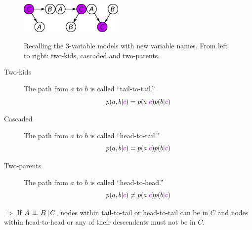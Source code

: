 \begin{figure}[H]
\centering
\includegraphics[width=0.15\textwidth]{fig/twokids-abc-color.pdf}\hspace{1cm}\includegraphics[width=0.15\textwidth]{fig/cascaded-abc-color.pdf}\hspace{2cm}\includegraphics[width=0.15\textwidth]{fig/twoparents-abc-color.pdf}
\caption{Recalling the 3-variable models with new variable names. From left to right: two-kids, cascaded and two-parents.\label{fig:3-var-highlighted}}
\end{figure}
\begin{description}
 \item[Two-kids] The path from $a$ to $b$ is called ``tail-to-tail.''
  \begin{equation}p(a,b|{\color{mypurple}c}) = p(a|{\color{mypurple}c})p(b|{\color{mypurple}c}) \end{equation}
 \item[Cascaded] The path from $a$ to $b$ is called ``head-to-tail.''
  \begin{equation}p(a,b|{\color{mypurple}c}) = p(a|{\color{mypurple}c})p(b|{\color{mypurple}c})\end{equation} 
 \item[Two-parents] The path from $a$ to $b$ is called ``head-to-head.''
  \begin{equation}p(a,b|{\color{mypurple}c}) \neq p(a|{\color{mypurple}c})p(b|{\color{mypurple}c})\end{equation}  
\end{description}

$\Rightarrow$ If $A \perp\!\!\!\perp B \,|\, C$, nodes within tail-to-tail or head-to-tail can be in $C$ and nodes within head-to-head or any of their descendents must not be in $C$.\vspace{2mm}

